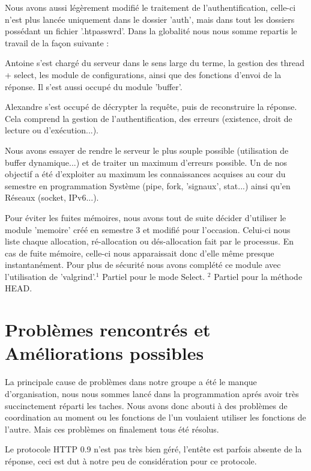 \documentclass[12pt,a4paper,utf8x]{report}
\begin{document}
Nous avons aussi légèrement modifié le traitement de l'authentification,
celle-ci n'est plus lancée uniquement dans le dossier 'auth', mais dans
tout les dossiers possédant un fichier '.htpasswrd'.
Dans la globalité nous nous somme repartis le travail de la façon
suivante :

Antoine s'est chargé du serveur dans le sens large du terme, la gestion
des thread + select, les module de configurations, ainsi que des
fonctions d'envoi de la réponse. Il s'est aussi occupé du module
'buffer'.

Alexandre s'est occupé de décrypter la requête, puis de reconstruire la
réponse. Cela comprend la gestion de l'authentification, des erreurs
(existence, droit de lecture ou d'exécution...).

Nous avons essayer de rendre le serveur le plus souple possible
(utilisation de buffer dynamique...) et de traiter un maximum d'erreurs
possible. Un de nos objectif a été d'exploiter au maximum les connaissances acquises au
cour du semestre en programmation Système (pipe, fork, 'signaux',
stat...) ainsi qu'en Réseaux (socket, IPv6...).

Pour éviter les fuites mémoires, nous avons tout de suite décider d'utiliser le module 'memoire' créé en semestre 3 et modifié pour l'occasion. Celui-ci nous liste chaque allocation, ré-allocation ou dés-allocation fait par le processus. En cas de fuite mémoire, celle-ci nous apparaissait donc d'elle même presque instantanément. Pour plus de sécurité nous avons complété ce module avec l'utilisation de 'valgrind'.\newline \newline $^{1}$ Partiel pour le mode Select. \newline $^{2}$ Partiel pour la méthode HEAD.

\chapter{Problèmes rencontrés et Améliorations possibles}
La principale cause de problèmes dans notre groupe a été le manque
d'organisation, nous nous sommes lancé dans la programmation aprés avoir
très succinctement réparti les taches. Nous avons donc abouti à des problèmes
de coordination au moment ou les fonctions de l'un voulaient utiliser
les fonctions de l'autre. Mais ces problèmes on finalement tous été résolus.

Le protocole HTTP 0.9 n'est pas très bien géré, l'entête est parfois
absente de la réponse, ceci est dut à notre peu de considération pour ce
protocole.
\end{document}
